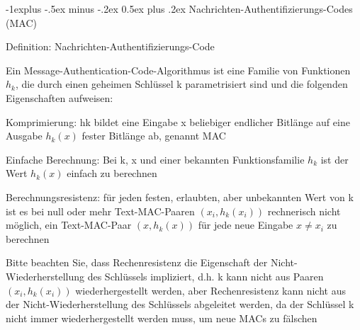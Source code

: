 \documentclass[a4paper]{article}
\makeatletter
\renewcommand{\subsection}{\@startsection{subsection}{2}{0mm}%
 {-1explus -.5ex minus -.2ex}%
 {0.5ex plus .2ex}%
 {\normalfont\normalsize\bfseries}}
\makeatother
\begin{document}
\begin{multicols}{3}
      \subsection{Nachrichten-Authentifizierungs-Codes (MAC)}
      \begin{itemize*}
            \item Definition: Nachrichten-Authentifizierungs-Code
            \begin{itemize*}
                  \item Ein Message-Authentication-Code-Algorithmus ist eine Familie von Funktionen $h_k$, die durch einen geheimen Schlüssel k parametrisiert sind und die folgenden Eigenschaften aufweisen:
                  \begin{itemize*}
                        \item Komprimierung: hk bildet eine Eingabe x beliebiger endlicher Bitlänge auf eine Ausgabe $h_k(x)$ fester Bitlänge ab, genannt MAC
                        \item Einfache Berechnung: Bei k, x und einer bekannten Funktionsfamilie $h_k$ ist der Wert $h_k(x)$ einfach zu berechnen
                        \item Berechnungsresistenz: für jeden festen, erlaubten, aber unbekannten Wert von k ist es bei null oder mehr Text-MAC-Paaren $(x_i, h_k(x_i))$ rechnerisch nicht möglich, ein Text-MAC-Paar $(x, h_k(x))$ für jede neue Eingabe $x\not= x_i$ zu berechnen
                  \end{itemize*}
                  \item Bitte beachten Sie, dass Rechenresistenz die Eigenschaft der Nicht-Wiederherstellung des Schlüssels impliziert, d.h. k kann nicht aus Paaren $(x_i,h_k(x_i))$ wiederhergestellt werden, aber Rechenresistenz kann nicht aus der Nicht-Wiederherstellung des Schlüssels abgeleitet werden, da der Schlüssel k nicht immer wiederhergestellt werden muss, um neue MACs zu fälschen
            \end{itemize*}
      \end{itemize*}


\end{multicols}
\end{document}
